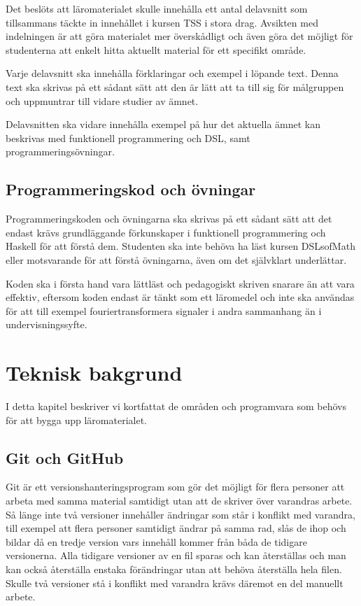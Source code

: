 \documentclass[12pt,a4paper,twoside,openright]{article}
\begin{document}
Det beslöts att läromaterialet skulle innehålla ett antal delavsnitt
som tillsammans täckte in innehållet i kursen TSS i stora drag.
Avsikten med indelningen är att göra materialet mer överskådligt och
även göra det möjligt för studenterna att enkelt hitta aktuellt
material för ett specifikt område.

Varje delavsnitt ska innehålla förklaringar och exempel i löpande
text.  Denna text ska skrivas på ett sådant sätt att den är lätt att
ta till sig för målgruppen och uppmuntrar till vidare studier av
ämnet.

Delavsnitten ska vidare innehålla exempel på hur det aktuella ämnet
kan beskrivas med funktionell programmering och DSL, samt
programmeringsövningar.

\subsection{Programmeringskod och övningar}

Programmeringskoden och övningarna ska skrivas på ett sådant sätt att
det endast krävs grundläggande förkunskaper i funktionell
programmering och Haskell för att förstå dem. Studenten ska inte
behöva ha läst kursen DSLsofMath eller motsvarande för att förstå
övningarna, även om det självklart underlättar.

Koden ska i första hand vara lättläst och pedagogiskt skriven snarare
än att vara effektiv, eftersom koden endast är tänkt som ett läromedel
och inte ska användas för att till exempel fouriertransformera
signaler i andra sammanhang än i undervisningssyfte.

\section{Teknisk bakgrund}
I detta kapitel beskriver vi kortfattat de områden och programvara som
behövs för att bygga upp läromaterialet.

\subsection{Git och GitHub}
Git är ett versionshanteringsprogram som gör det möjligt för flera
personer att arbeta med samma material samtidigt utan att de skriver
över varandras arbete. Så länge inte två versioner innehåller
ändringar som står i konflikt med varandra, till exempel att flera
personer samtidigt ändrar på samma rad, slås de ihop och bildar då en
tredje version vars innehåll kommer från båda de tidigare
versionerna. Alla tidigare versioner av en fil sparas och kan
återställas och man kan också återställa enstaka förändringar utan att
behöva återställa hela filen. Skulle två versioner stå i konflikt med
varandra krävs däremot en del manuellt arbete.
\end{document}

